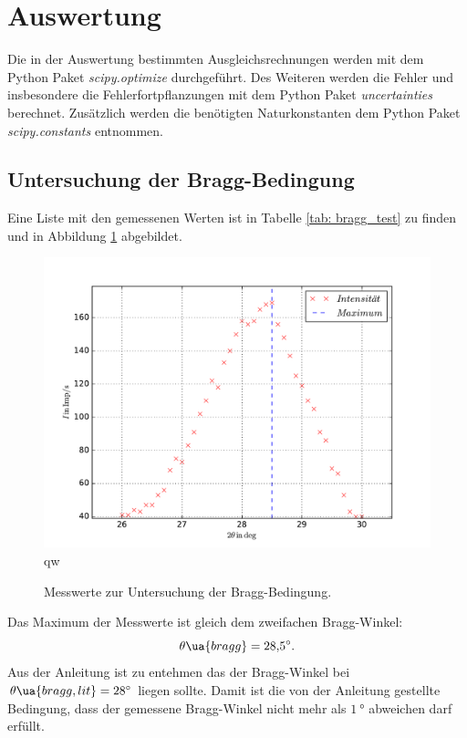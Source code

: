 \section{Auswertung}
Die in der Auswertung bestimmten Ausgleichsrechnungen werden mit
dem Python Paket \emph{scipy.optimize}\cite{scipy} durchgeführt.
Des Weiteren werden die Fehler und insbesondere die Fehlerfortpflanzungen
mit dem Python Paket \emph{uncertainties}\cite{uncertainties} berechnet.
Zusätzlich werden die benötigten Naturkonstanten dem Python Paket \emph{scipy.constants}\cite{scipy}
entnommen.
\FloatBarrier
\subsection{Untersuchung der Bragg-Bedingung}
Eine Liste mit den gemessenen Werten ist in Tabelle \ref{tab: bragg_test} zu finden und in Abbildung \ref{fig: bragg_plot} abgebildet.

\begin{figure}
  \centering
  \includegraphics[width=0.8 \textwidth]{../Messdaten/bragbed.pdf}
qw  \caption{Messwerte zur Untersuchung der Bragg-Bedingung.}
  \label{fig: bragg_plot}
\end{figure}
Das Maximum der Messwerte ist gleich dem zweifachen Bragg-Winkel:
\begin{equation}
  \label{eq:bestimmt_bragg_winkel}
  \theta\ua{bragg}=\SI{28.5}{\degree}.
\end{equation} %
Aus der Anleitung \cite{anleitung602} ist zu entehmen das der Bragg-Winkel bei $\theta\ua{bragg,lit}=\SI{28}{\degree}$ liegen sollte.
Damit ist die von der Anleitung gestellte Bedingung, dass der gemessene Bragg-Winkel nicht mehr
als $\SI{1}{\degree}$ abweichen darf erfüllt.
\FloatBarrier

